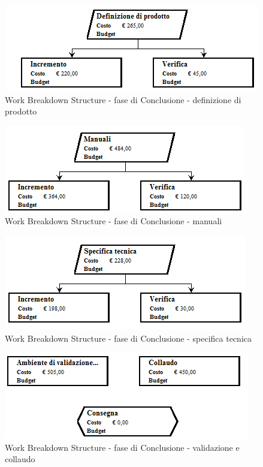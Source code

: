 \documentclass[a4paper]{article}
\begin{document}
				\begin{figure}[H]
					\centering
					\includegraphics[width=\textwidth]{wbs/wbs_conclusione_5}
					\caption{Work Breakdown Structure - fase di Conclusione - definizione di prodotto}
				\end{figure}
				\begin{figure}[H]
					\centering
					\includegraphics[width=\textwidth]{wbs/wbs_conclusione_6}
					\caption{Work Breakdown Structure - fase di Conclusione - manuali}
				\end{figure}
				\begin{figure}[H]
					\centering
					\includegraphics[width=\textwidth]{wbs/wbs_conclusione_8}
					\caption{Work Breakdown Structure - fase di Conclusione - specifica tecnica}
				\end{figure}
				\begin{figure}[H]
					\centering
					\includegraphics[width=\textwidth]{wbs/wbs_conclusione_7}
					\caption{Work Breakdown Structure - fase di Conclusione - validazione e collaudo}
				\end{figure}
\end{document}
